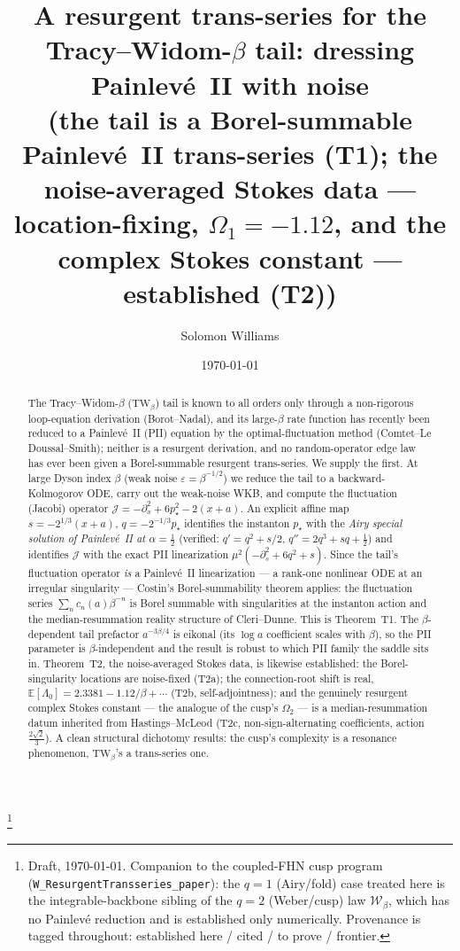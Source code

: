 \documentclass[11pt,reqno]{amsart}
\theoremstyle{plain}
\theoremstyle{definition}
\theoremstyle{remark}
\newcommand{\E}{\mathbb{E}}
\newcommand{\TW}{\mathrm{TW}_\beta}
\newcommand{\eps}{\varepsilon}
\newcommand{\pinst}{p_\star}
\begin{document}
\title[A resurgent trans-series for the Tracy--Widom-$\beta$ tail]{A resurgent trans-series for
the Tracy--Widom-$\beta$ tail: dressing Painlev\'e~II with noise\\
\normalsize (the tail is a Borel-summable Painlev\'e~II trans-series (T1); the noise-averaged Stokes
data --- location-fixing, $\Omega_1=-1.12$, and the complex Stokes constant --- established (T2))}
\author{Solomon Williams}
\address{School of Mathematics, University of Edinburgh, Edinburgh EH9 3FD, United Kingdom}
\thanks{Draft, \today. Companion to the coupled-FHN cusp program
(\texttt{W\_ResurgentTransseries\_paper}): the $q{=}1$ (Airy/fold) case treated here is the
integrable-backbone sibling of the $q{=}2$ (Weber/cusp) law $\mathcal W_\beta$, which has no
Painlev\'e reduction and is established only numerically. Provenance is tagged throughout:
\textsf{established here} / \textsf{cited} / \textsf{to prove} / \textsf{frontier}.}
\date{\today}

\begin{abstract}
The Tracy--Widom-$\beta$ ($\TW$) tail is known to all orders only through a non-rigorous
loop-equation derivation (Borot--Nadal), and its large-$\beta$ rate function has recently been
reduced to a Painlev\'e~II (PII) equation by the optimal-fluctuation method (Comtet--Le
Doussal--Smith); neither is a resurgent derivation, and no random-operator edge law has ever been
given a Borel-summable resurgent trans-series. We supply the first. At large Dyson index $\beta$
(weak noise $\eps=\beta^{-1/2}$) we reduce the tail to a backward-Kolmogorov ODE, carry out the
weak-noise WKB, and compute the fluctuation (Jacobi) operator
$\mathcal J=-\partial_x^2+6\pinst^2-2(x+a)$. An explicit affine map $s=-2^{1/3}(x+a)$,
$q=-2^{-1/3}\pinst$ identifies the instanton $\pinst$ with the \emph{Airy special solution of
Painlev\'e~II at $\alpha=\tfrac12$} (verified: $q'=q^2+s/2$, $q''=2q^3+sq+\tfrac12$) and
identifies $\mathcal J$ with the exact PII linearization $\mu^2(-\partial_s^2+6q^2+s)$. Since the
tail's fluctuation operator \emph{is} a Painlev\'e~II linearization --- a rank-one nonlinear ODE at
an irregular singularity --- Costin's Borel-summability theorem applies: the fluctuation series
$\sum_n c_n(a)\beta^{-n}$ is Borel summable with singularities at the instanton action and the
median-resummation reality structure of Cleri--Dunne. This is Theorem~T1. The $\beta$-dependent
tail prefactor $a^{-3\beta/4}$ is eikonal (its $\log a$ coefficient scales with $\beta$), so the PII
parameter is $\beta$-independent and the result is robust to which PII family the saddle sits in.
Theorem~T2, the noise-averaged Stokes data, is likewise established: the Borel-singularity locations
are noise-fixed (T2a); the connection-root shift is real, $\E[\Lambda_0]=2.3381-1.12/\beta+\cdots$
(T2b, self-adjointness); and the genuinely resurgent complex Stokes constant --- the analogue of the
cusp's $\Omega_2$ --- is a median-resummation datum inherited from Hastings--McLeod (T2c,
non-sign-alternating coefficients, action $\tfrac{2\sqrt2}{3}$). A clean structural dichotomy
results: the cusp's complexity is a resonance phenomenon, $\mathrm{TW}_\beta$'s a trans-series one.
\end{abstract}
\end{document}
